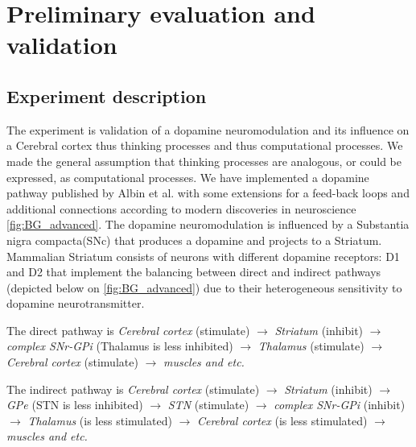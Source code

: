 \documentclass[procedia]{easychair}
\begin{document}
\section{Preliminary evaluation and validation}
\label{sec:val}

\subsection{Experiment description}

The experiment is validation of a dopamine neuromodulation and its influence on a Cerebral
cortex thus thinking processes and thus computational processes.
We made the general assumption that thinking processes are analogous,
or could be expressed, as computational processes. We have implemented a dopamine pathway published by
Albin et al.\cite{dopa_albin} with some extensions for a feed-back loops and additional
connections according to modern discoveries in neuroscience \autoref{fig:BG_advanced}.
The dopamine neuromodulation is influenced by a Substantia nigra compacta(SNc) that produces a dopamine
and projects to a Striatum.
Mammalian Striatum consists of neurons with different dopamine receptors: D1 and D2
that implement the balancing between direct and indirect pathways (depicted below
on \autoref{fig:BG_advanced}) due to their heterogeneous sensitivity to dopamine
neurotransmitter.

The direct pathway is
\textit{Cerebral cortex} (stimulate) $\to$ \textit{Striatum} (inhibit) $\to$ \textit{complex SNr-GPi} (Thalamus is less inhibited) $\to$ \textit{Thalamus} (stimulate) $\to$ \textit{Cerebral cortex} (stimulate) $\to$ \textit{muscles and etc.}

The indirect pathway is
\textit{Cerebral cortex} (stimulate) $\to$ \textit{Striatum} (inhibit) $\to$ \textit{GPe} (STN is less inhibited) $\to$ \textit{STN} (stimulate) $\to$ \textit{complex SNr-GPi} (inhibit) $\to$ \textit{Thalamus} (is less stimulated) $\to$ \textit{Cerebral cortex} (is less stimulated) $\to$ \textit{muscles and etc.}\\
\end{document}
